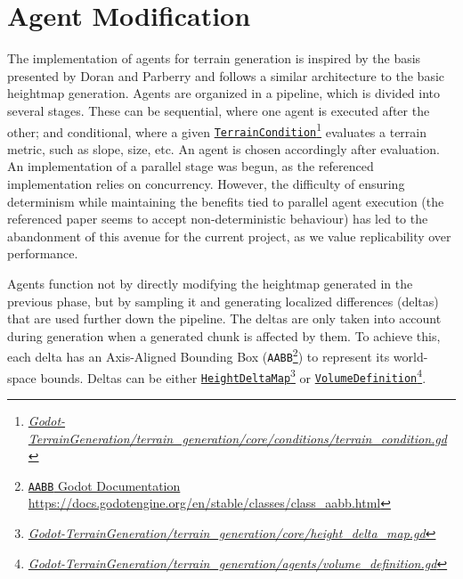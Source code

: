 \section{Agent Modification}

The implementation of agents for terrain generation is inspired by the basis presented by Doran and Parberry \cite{Doran:2010:CPT} and follows a similar architecture to the basic heightmap generation.
Agents are organized in a pipeline, which is divided into several stages.
These can be sequential, where one agent is executed after the other; and conditional, where a given \href{https://github.com/fsande/TFG---Eric-Rios/blob/main/Godot-TerrainGeneration/terrain_generation/core/conditions/terrain_condition.gd}{\texttt{TerrainCondition}}\footnote{\href{https://github.com/fsande/TFG---Eric-Rios/blob/main/Godot-TerrainGeneration/terrain_generation/core/conditions/terrain_condition.gd}{\textit{Godot-TerrainGeneration/terrain\_generation/core/conditions/terrain\_condition.gd}}} evaluates a terrain metric, such as slope, size, etc.
An agent is chosen accordingly after evaluation.
An implementation of a parallel stage was begun, as the referenced \cite{Doran:2010:CPT} implementation relies on concurrency.
However, the difficulty of ensuring determinism while maintaining the benefits tied to parallel agent execution (the referenced paper seems to accept non-deterministic behaviour) has led to the abandonment of this avenue for the current project, as we value replicability over performance.

Agents function not by directly modifying the heightmap generated in the previous phase, but by sampling it and generating localized differences (deltas) that are used further down the pipeline.
The deltas are only taken into account during generation when a generated chunk is affected by them. 
To achieve this, each delta has an Axis-Aligned Bounding Box (\texttt{AABB}\footnote{\href{https://docs.godotengine.org/en/stable/classes/class_aabb.html}{\texttt{AABB} Godot Documentation}\\ \hspace*{1.9em}\url{https://docs.godotengine.org/en/stable/classes/class_aabb.html}}) to represent its world-space bounds.
Deltas can be either \href{https://github.com/fsande/TFG---Eric-Rios/blob/main/Godot-TerrainGeneration/terrain_generation/core/height_delta_map.gd}{\texttt{HeightDeltaMap}}\footnote{\href{https://github.com/fsande/TFG---Eric-Rios/blob/main/Godot-TerrainGeneration/terrain_generation/core/height_delta_map.gd}{\textit{Godot-TerrainGeneration/terrain\_generation/core/height\_delta\_map.gd}}} or \href{https://github.com/fsande/TFG---Eric-Rios/blob/main/Godot-TerrainGeneration/terrain_generation/agents/volume_definition.gd}{\texttt{VolumeDefinition}}\footnote{\href{https://github.com/fsande/TFG---Eric-Rios/blob/main/Godot-TerrainGeneration/terrain_generation/agents/volume_definition.gd}{\textit{Godot-TerrainGeneration/terrain\_generation/agents/volume\_definition.gd}}}.

